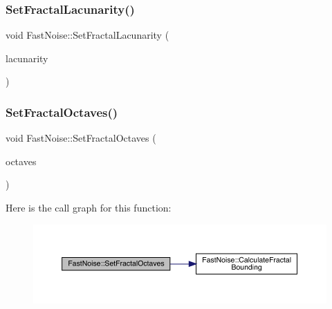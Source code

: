 \subsubsection{\texorpdfstring{Set\+Fractal\+Lacunarity()}{SetFractalLacunarity()}}
{\footnotesize\ttfamily void Fast\+Noise\+::\+Set\+Fractal\+Lacunarity (\begin{DoxyParamCaption}\item[{\mbox{\hyperlink{_fast_noise_8h_a75a9ef6d2541c4921815b885bfd449c3}{F\+N\+\_\+\+D\+E\+C\+I\+M\+AL}}}]{lacunarity }\end{DoxyParamCaption})\hspace{0.3cm}{\ttfamily [inline]}}

\mbox{\label{class_fast_noise_a7c7254a79a239e8014fd0078cee007dd}} 
\subsubsection{\texorpdfstring{Set\+Fractal\+Octaves()}{SetFractalOctaves()}}
{\footnotesize\ttfamily void Fast\+Noise\+::\+Set\+Fractal\+Octaves (\begin{DoxyParamCaption}\item[{int}]{octaves }\end{DoxyParamCaption})\hspace{0.3cm}{\ttfamily [inline]}}

Here is the call graph for this function\+:
\nopagebreak
\begin{figure}[H]
\begin{center}
\leavevmode
\includegraphics[width=350pt]{d1/dd8/class_fast_noise_a7c7254a79a239e8014fd0078cee007dd_cgraph}
\end{center}
\end{figure}
\mbox{\label{class_fast_noise_ad5ebb22802d87f7eb425a711658e47d8}} 
